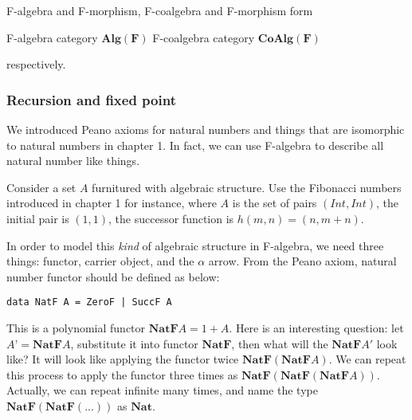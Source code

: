 \documentclass{article}
\begin{document}
F-algebra and F-morphism, F-coalgebra and F-morphism form

\begin{center}
  F-algebra category $\pmb{Alg}(\mathbf{F})$ \quad \quad \quad
  F-coalgebra category $\pmb{CoAlg}(\mathbf{F})$
\end{center}

respectively.

\begin{Exercise}
\end{Exercise}

\subsubsection{Recursion and fixed point}

We introduced Peano axioms for natural numbers and things that are isomorphic to natural numbers in chapter 1. In fact, we can use F-algebra to describe all natural number like things.

Consider a set $A$ furnitured with algebraic structure. Use the Fibonacci numbers introduced in chapter 1 for instance, where $A$ is the set of pairs $(Int, Int)$, the initial pair is $(1, 1)$, the successor function is $h(m, n) = (n, m + n)$.

In order to model this {\em kind} of algebraic structure in F-algebra, we need three things: functor, carrier object, and the $\alpha$ arrow. From the Peano axiom, natural number functor should be defined as below:

\lstset{frame=none}
\begin{lstlisting}
data NatF A = ZeroF | SuccF A
\end{lstlisting}

This is a polynomial functor $\mathbf{NatF} A = 1 + A$. Here is an interesting question: let $A’ = \mathbf{NatF} A$, substitute it into functor $\mathbf{NatF}$, then what will the $\mathbf{NatF} A'$ look like? It will look like applying the functor twice $\mathbf{NatF}(\mathbf{NatF} A)$. We can repeat this process to apply the functor three times as $\mathbf{NatF}(\mathbf{NatF}(\mathbf{NatF} A))$. Actually, we can repeat infinite many times, and name the type $\mathbf{NatF}(\mathbf{NatF}(...))$ as $\mathbf{Nat}$.
\end{document}
